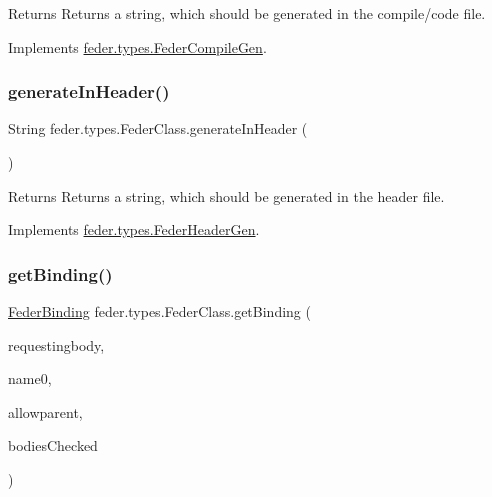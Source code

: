 \begin{DoxyReturn}{Returns}
Returns a string, which should be generated in the compile/code file. 
\end{DoxyReturn}


Implements \hyperlink{interfacefeder_1_1types_1_1FederCompileGen}{feder.\+types.\+Feder\+Compile\+Gen}.

\mbox{\label{classfeder_1_1types_1_1FederClass_a13b9740438b256dba8be6e63c8a1cc88}} 
\subsubsection{\texorpdfstring{generate\+In\+Header()}{generateInHeader()}}
{\footnotesize\ttfamily String feder.\+types.\+Feder\+Class.\+generate\+In\+Header (\begin{DoxyParamCaption}{ }\end{DoxyParamCaption})}

\begin{DoxyReturn}{Returns}
Returns a string, which should be generated in the header file. 
\end{DoxyReturn}


Implements \hyperlink{interfacefeder_1_1types_1_1FederHeaderGen}{feder.\+types.\+Feder\+Header\+Gen}.

\mbox{\label{classfeder_1_1types_1_1FederClass_aa91ec183841e74c532a87ca8883cf782}} 
\subsubsection{\texorpdfstring{get\+Binding()}{getBinding()}}
{\footnotesize\ttfamily \hyperlink{classfeder_1_1types_1_1FederBinding}{Feder\+Binding} feder.\+types.\+Feder\+Class.\+get\+Binding (\begin{DoxyParamCaption}\item[{\hyperlink{classfeder_1_1types_1_1FederBody}{Feder\+Body}}]{requestingbody,  }\item[{String}]{name0,  }\item[{boolean}]{allowparent,  }\item[{List$<$ \hyperlink{classfeder_1_1types_1_1FederBody}{Feder\+Body} $>$}]{bodies\+Checked }\end{DoxyParamCaption})\hspace{0.3cm}{\ttfamily [protected]}}


